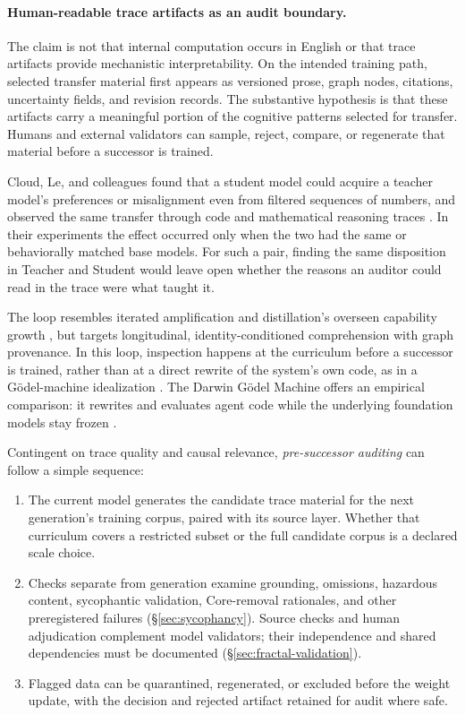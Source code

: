 \documentclass[11pt]{article}
\begin{document}
					\paragraph{Human-readable trace artifacts as an audit boundary.} The claim is not that internal computation occurs in English or that trace artifacts provide mechanistic interpretability. On the intended training path, selected transfer material first appears as
versioned prose, graph nodes, citations, uncertainty fields, and revision
records. The substantive hypothesis is that these artifacts carry a meaningful
portion of the cognitive patterns selected for transfer. Humans and external validators can sample, reject, compare, or regenerate that material before a successor is trained.

Cloud, Le, and colleagues found that a student model could acquire a teacher
model's preferences or misalignment even from filtered sequences of numbers,
and observed the same transfer through code and mathematical reasoning traces
\cite{cloud2026hidden}. In their experiments the effect occurred only when the
two had the same or behaviorally matched base models. For such a pair, finding
the same disposition in Teacher and Student would leave open whether the
reasons an auditor could read in the trace were what taught it.

			The loop resembles iterated amplification and distillation's overseen
capability growth \cite{christiano2018amplification}, but targets longitudinal,
identity-conditioned comprehension with graph provenance. In this loop,
inspection happens at the curriculum before a successor is trained, rather than
at a direct rewrite of the system's own code, as in a G\"odel-machine
idealization \cite{schmidhuber2006goedelmachinesselfreferentialuniversal}. The
Darwin G\"odel Machine offers an empirical comparison: it rewrites and
evaluates agent code while the underlying foundation models stay frozen
\cite{zhang2025darwingodel}.

			Contingent on trace quality and causal relevance, \emph{pre-successor auditing} can follow a simple sequence:
			\begin{enumerate}
				\item The current model generates the candidate trace material for the next
generation's training corpus, paired with its source layer. Whether that
curriculum covers a restricted subset or the full candidate corpus is a
declared scale choice.
				\item Checks separate from generation examine grounding, omissions,
hazardous content, sycophantic validation, Core-removal rationales, and other
preregistered failures (\S\ref{sec:sycophancy}). Source checks and human
adjudication complement model validators; their independence and shared
dependencies must be documented
(\S\ref{sec:fractal-validation}).
				\item Flagged data can be quarantined, regenerated, or excluded before the weight update, with the decision and rejected artifact retained for audit where safe.
			\end{enumerate}
\end{document}
